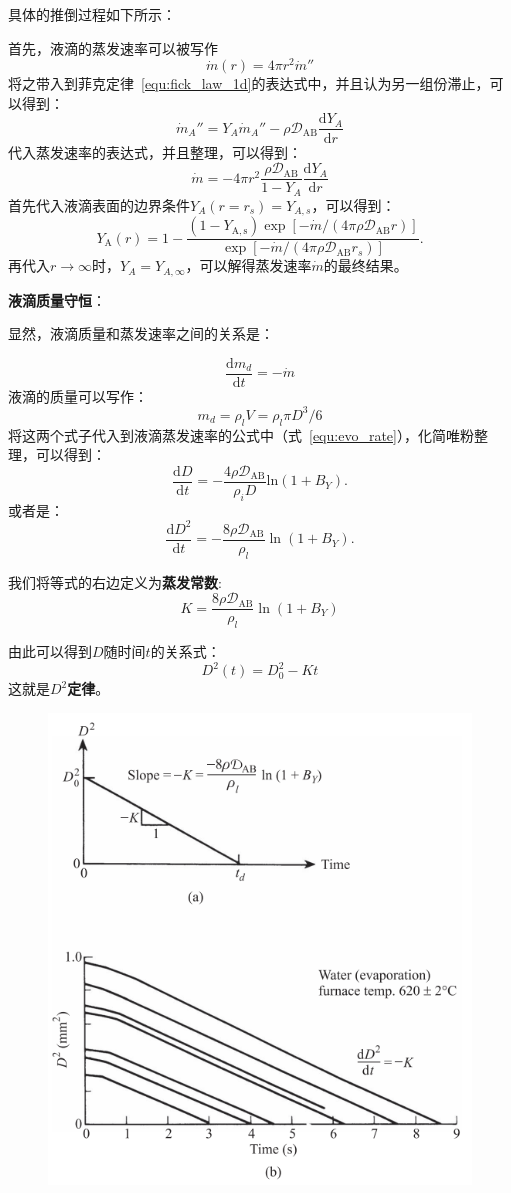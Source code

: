\documentclass[10pt, landscape]{extarticle}
\numberwithin{equation}{section}
\newcommand{\dd}{\mathrm{d}}
\begin{document}
\begin{multicols}{3}
具体的推倒过程如下所示：

{
    \scriptsize\color{gray}
    首先，液滴的蒸发速率可以被写作
    \[
        \dot{m}(r) = 4\pi r^2 \dot{m}''
    \]
    将之带入到菲克定律~\ref{equ:fick_law_1d}的表达式中，并且认为另一组份滞止，可以得到：
    \[
        \dot{m}_A'' = Y_A\dot{m}_A'' - \rho\mathcal{D}_\mathrm{AB}\frac{\dd Y_A}{\dd r}
    \]
    代入蒸发速率的表达式，并且整理，可以得到：
    \[
        \dot{m}=-4\pi r^2 \frac{\rho \mathcal{D}_\mathrm{AB}}{1-Y_A}\frac{\dd Y_A}{\dd r}
    \]
    首先代入液滴表面的边界条件\(Y_A(r=r_s)=Y_{A,s}\)，可以得到：
    \[
        Y_{\mathrm{A}}(r)=1-{\frac{(1-Y_{\mathrm{A,s}})\exp[-\dot{m}/(4\pi\rho \mathcal{D}_{\mathrm{AB}}r)]}{\exp[-\dot{m}/(4\pi\rho \mathcal{D}_{\mathrm{AB}}r_{s})]}}.
    \]
    再代入\(r\to\infty\)时，\(Y_A=Y_{A,\infty}\)，可以解得蒸发速率\(\dot{m}\)的最终结果。
}

\textbf{液滴质量守恒}：

显然，液滴质量和蒸发速率之间的关系是：

\begin{equation}
    \frac{\dd m_d}{\dd t}=-\dot{m}
\end{equation}
液滴的质量可以写作：
\begin{equation}
    m_d = \rho_l V = \rho_l \pi D^3/6
\end{equation}
将这两个式子代入到液滴蒸发速率的公式中（式~\ref{equ:evo_rate}），化简唯粉整理，可以得到：
\begin{equation}
    \frac{\mathrm{d}D}{\mathrm{d}t}=-\frac{4\rho \mathcal{D}_\mathrm{AB}}{\rho_{i}D}\mathrm{ln}(1+B_{Y}).
\end{equation}
或者是：
\begin{equation}
    {\frac{\mathrm{d}D^{2}}{\mathrm{d}t}}=-{\frac{8\rho \mathcal{D}_{\mathrm{AB}}}{\rho_{l}}}\ln(1+B_{Y}).
\end{equation}

我们将等式的右边定义为\textbf{蒸发常数}:
\begin{equation}
    K = {\frac{8\rho \mathcal{D}_{\mathrm{AB}}}{\rho_{l}}}\ln(1+B_{Y})
\end{equation}

由此可以得到\(D\)随时间\(t\)的关系式：
\begin{equation}
    D^2(t)=D_0^2 - Kt
\end{equation}
这就是\textbf{\(D^2\)定律}。

\begin{figure}[H]
    \centering
    \includegraphics[width=.3\textwidth]{img/d2.png}
\end{figure}


\end{multicols}
\end{document}
